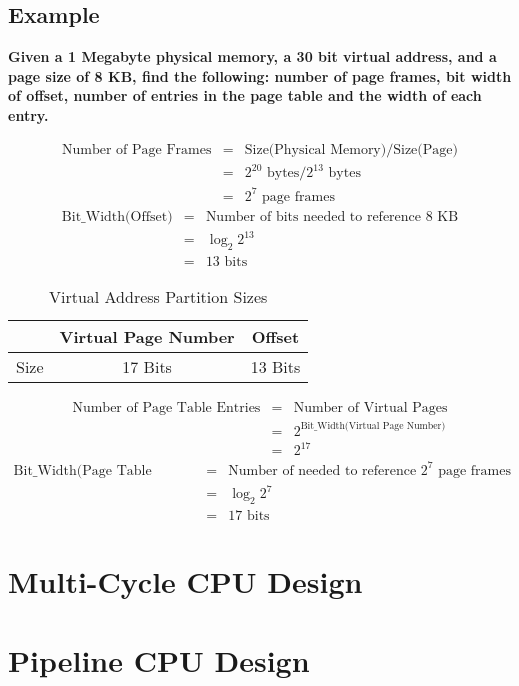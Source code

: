 \documentclass[11pt]{article}
\begin{document}
\subsection{Example}

\textbf{Given a 1 Megabyte physical memory, a 30 bit virtual address, and a page size of 8 KB, find the following: number of page frames, bit width of offset, number of entries in the page table and the width of each entry.}

\begin{eqnarray*}
	\text{Number of Page Frames} &=& \text{Size(Physical Memory)} / \text{Size(Page)}\\
		&=& 2^{20} \text{ bytes} / 2^{13} \text{ bytes}\\
		&=& 2^{7} \text{ page frames}
\end{eqnarray*}
\begin{eqnarray*}
	\text{Bit\_Width(Offset)} &=& \text{Number of bits needed to reference 8 KB}\\
	&=& \log_2 2^{13}\\
	&=& 13 \text{ bits}
\end{eqnarray*}
\begin{table}[H]
	\centering
	\caption*{Virtual Address Partition Sizes}
	\begin{tabular}{| c | c | c |}
		\hline
				&	Virtual Page Number	&	Offset\\
		\hline
		Size	&	17 Bits	&	13 Bits\\
		\hline
	\end{tabular}
\end{table}
\begin{eqnarray*}
	\text{Number of Page Table Entries} &=& \text{Number of Virtual Pages}\\
		&=& 2^{\text{Bit\_Width(Virtual Page Number)}}\\
		&=& 2^{17}
\end{eqnarray*}
\begin{eqnarray*}
	\text{Bit\_Width(Page Table Entry)} &=& \text{Number of needed to reference } 2^{7} \text{ page frames}\\
	&=& \log_2 2^{7}\\
	&=& 17 \text{ bits}
\end{eqnarray*}
\section{Multi-Cycle CPU Design}

\section{Pipeline CPU Design}
\end{document}
